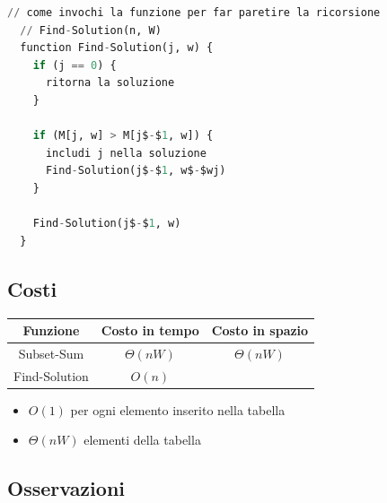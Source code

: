 \begin{lstlisting}[language=Python, mathescape=true]
  // come invochi la funzione per far paretire la ricorsione
  // Find-Solution(n, W)
  function Find-Solution(j, w) {
    if (j == 0) {
      ritorna la soluzione
    }
  
    if (M[j, w] > M[j$-$1, w]) {
      includi j nella soluzione 
      Find-Solution(j$-$1, w$-$wj)
    }
  
    Find-Solution(j$-$1, w)
  }
\end{lstlisting}

\subsection{Costi}

\begin{center}
  \begin{tabular}{ |c|c|c| }
    \hline
    \textbf{Funzione} & \textbf{Costo in tempo} & \textbf{Costo in spazio} \\
    \hline
    Subset-Sum        & $\Theta(nW)$            & $\Theta(nW)$              \\
    \hline
    Find-Solution     & $O(n)$                  &                            \\
    \hline
  \end{tabular}
\end{center}

\begin{itemize}

  \item
        $O(1)$ per ogni elemento inserito nella tabella
  \item
        $\Theta(nW)$ elementi della tabella
\end{itemize}


\subsection{Osservazioni}

